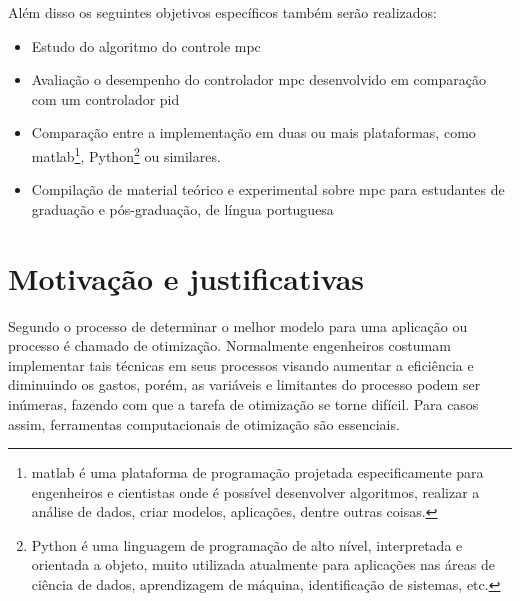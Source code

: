 Além disso os seguintes objetivos específicos também serão realizados:
\begin{itemize}
    \item Estudo do algoritmo do controle \acrshort{mpc}
    \item Avaliação o desempenho do controlador \acrshort{mpc} desenvolvido em
        comparação com um controlador \acrshort{pid}
    \item Comparação entre a implementação em duas ou mais plataformas,
        como \acrshort{matlab}\footnote{
            \acrshort{matlab} é uma plataforma                           %
            de programação projetada especificamente para engenheiros e cientistas                  %
            onde é possível desenvolver algoritmos, realizar a análise de dados,                    %
            criar modelos, aplicações, dentre outras coisas.},                                      %
        Python\footnote{
            Python é uma linguagem de programação de alto nível,                                    %
            interpretada e orientada a objeto, muito utilizada atualmente para                      %
            aplicações nas áreas de ciência de dados, aprendizagem de máquina,                      %
            identificação de sistemas, etc.}                                                        %
        ou similares.
    \item Compilação de material teórico e experimental sobre \acrshort{mpc}
        para estudantes de graduação e pós-graduação, de língua portuguesa
\end{itemize}

\section{Motivação e justificativas}
\label{sec:motivacao_e_justificativas}

Segundo  o processo de determinar o melhor modelo
para uma aplicação ou processo é chamado de otimização. Normalmente engenheiros
costumam implementar tais técnicas em seus processos visando aumentar a
eficiência e diminuindo os gastos, porém, as variáveis e limitantes do processo
podem ser inúmeras, fazendo com que a tarefa de otimização se torne difícil.
Para casos assim, ferramentas computacionais de otimização são essenciais. \cite{Parkinson2018}

